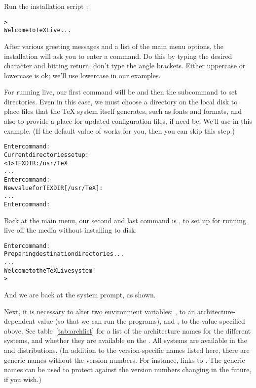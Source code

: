 \documentclass{article}
\begin{document}
\startinst

Run the installation script :
\begin{alltt}
> 
Welcome to TeX Live...
\end{alltt}

\def\firstinstcommand{%
\noindent After various greeting messages and a list of the main menu
options, the installation will ask you to enter a command.  Do this by
typing the desired character and hitting return; don't type the angle
brackets.  Either uppercase or lowercase is ok; we'll use lowercase in
our examples.
}
\firstinstcommand

For running live, our first command will be  and then the
subcommand  to set directories.  Even in this case, we must
choose a directory on the local disk to place files that the \TeX{}
system itself generates, such as fonts and formats, and also to provide
a place for updated configuration files, if need be.  We'll use
 in this example. (If the default value
of  works for you, then you can skip this step.)
\begin{alltt}
Enter command: 
Current directories setup:
<1>  TEXDIR:     /usr/TeX
...
Enter command: 
New value for TEXDIR [/usr/TeX]: 
...
Enter command: 
\end{alltt}

\noindent Back at the main menu, our second and last command is
, to set up for running live off the media without installing
to disk:
\begin{alltt}
Enter command: 
Preparing destination directories...
...
Welcome to the TeX Live system!
>
\end{alltt}

\noindent And we are back at the system prompt, as shown.

Next, it is necessary to alter two environment variables:
, to an architecture-dependent value (so that we can run
the programs), and , to the value specified above.  See
table~\ref{tab:archlist} for a list of the architecture names for the
different systems, and whether they are available on the 
\CD.  All systems are available in the  and 
distributions.  (In addition to the version-specific names listed here,
there are generic names without the version numbers.  For instance,
 links to .  The
generic names can be used to protect against the version numbers
changing in the future, if you wish.)
\end{document}
